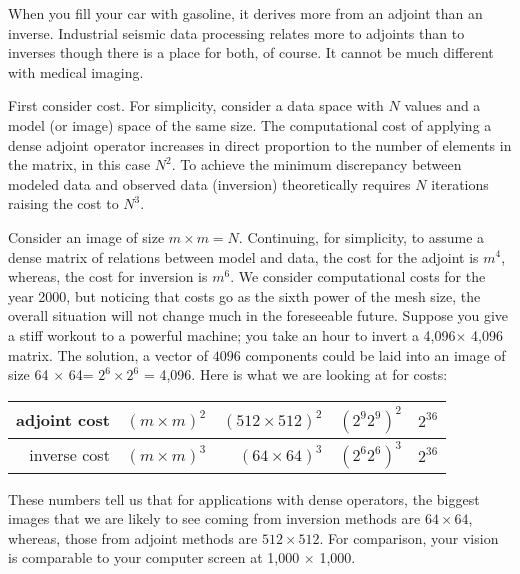 \par
When you fill your car with gasoline,
it derives more from an adjoint than an inverse.
Industrial seismic data processing relates more to
adjoints than to inverses
though there is a place for both, of course.
It cannot be much different with medical imaging.
\par
First consider cost.
For simplicity, consider a data space with $N$ values
and a model (or image) space of the same size.
The computational cost of applying a dense adjoint
operator increases in direct proportion to the number
of elements in the matrix, in this case $N^2$.
To achieve the minimum discrepancy between modeled data
and observed data (inversion) theoretically requires $N$ iterations
raising the cost to $N^3$.
\par
Consider an image of size $m\times m=N$.
Continuing, for simplicity, to assume a dense matrix of relations between
model and data,
the cost for the adjoint is $m^4$, whereas, the cost for inversion is $m^6$.
We consider computational costs for the year 2000, but
noticing that costs go as the sixth power of the mesh size,
the overall situation will not change much in the foreseeable future.
Suppose you give a stiff workout to a powerful machine;
you take an hour to invert a 4,096$\times$ 4,096 matrix.
The solution, a vector of $4096$ components could
be laid into an image of size 64 $\times$ 64= $2^6\times 2^6$ = 4,096.
Here is what we are looking at for costs:
\par
\begin{center}
\begin{tabular}{||r|r|r|r|r||}                                          \hline
adjoint cost &$(m\times m )^2$ & $(512\times 512)^2$ & $(2^9 2^9)^2$ & $2^{36}$
\\ \hline
inverse cost &$(m\times m )^3$ & $  (64\times 64)^3$ & $(2^6 2^6)^3$ & $2^{36}$
\\ \hline
\end{tabular}
\end{center}
\par\noindent
These numbers tell us that for applications with dense operators,
the biggest images that we are likely to see coming from inversion methods
are $64\times 64$, whereas, those from adjoint methods are $512\times 512$.
For comparison, your vision is comparable
to your computer screen at 1,000 $\times$ 1,000.

